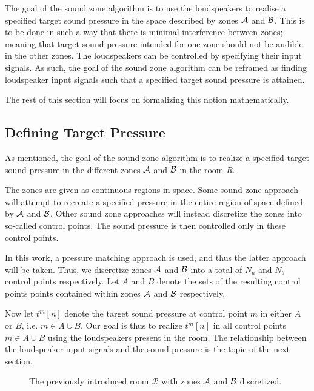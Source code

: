 The goal of the sound zone algorithm is to use the loudspeakers to realise a specified target sound pressure
in the space described by zones $\mathcal{A}$ and $\mathcal{B}$.
This is to be done in such a way that there is minimal interference between zones; 
meaning that target sound pressure intended for one zone should not be audible in the other zones.
The loudspeakers can be controlled by specifying their input signals.
As such, the goal of the sound zone algorithm can be reframed as finding loudspeaker input signals such that a specified target sound pressure is attained.

The rest of this section will focus on formalizing this notion mathematically.

\subsection{Defining Target Pressure}
\label{sec:sound_zones:data_model:target_pressure}
As mentioned, the goal of the sound zone algorithm is to realize a specified target sound pressure
in the different zones $\mathcal{A}$ and $\mathcal{B}$ in the room $R$.

The zones are given as continuous regions in space.
Some sound zone approach will attempt to recreate a specified pressure in the entire region of space defined by $\mathcal{A}$ and $\mathcal{B}$.
Other sound zone approaches will instead discretize the zones into so-called control points.
The sound pressure is then controlled only in these control points.

In this work, a pressure matching approach is used, and thus the latter approach will be taken.
Thus, we discretize zones $\mathcal{A}$ and $\mathcal{B}$ into a total of $N_a$ and $N_b$ control points respectively.   
Let $A$ and $B$ denote the sets of the resulting control points points contained within zones $\mathcal{A}$ and $\mathcal{B}$ respectively.

Now let $t^{m}[n]$ denote the target sound pressure at control point $m$ in either $A$ or $B$, i.e. $m\in A \cup B$.
Our goal is thus to realize $t^{m}[n]$ in all control points $m\in A \cup B$ using the loudspeakers present in the room.
The relationship between the loudspeaker input signals and the sound pressure is the topic of the next section.

\begin{figure}
    \centering
    
    \caption{The previously introduced room $\mathcal{R}$ with zones $\mathcal{A}$ and $\mathcal{B}$ discretized.}
\end{figure}


